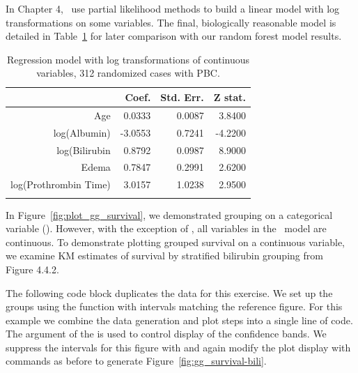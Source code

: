 \documentclass[nojss]{jss}\usepackage[]{graphicx}\usepackage[]{color}
\begin{document}
In Chapter 4,~\cite{fleming:1991} use partial likelihood methods to build a linear model with log transformations on some variables. The final, biologically reasonable model is detailed in Table~\ref{T:FHmodel} for later comparison with our random forest model results.

\begin{table}[ht]
\centering
{\footnotesize
\begin{tabular}{rrrr}
  \toprule
 & Coef. & Std. Err. & Z stat. \\ 
  \midrule
Age & 0.0333 & 0.0087 & 3.8400 \\ 
   \rowcolor[gray]{0.95}log(Albumin) & -3.0553 & 0.7241 & -4.2200 \\ 
  log(Bilirubin & 0.8792 & 0.0987 & 8.9000 \\ 
   \rowcolor[gray]{0.95}Edema & 0.7847 & 0.2991 & 2.6200 \\ 
  log(Prothrombin Time) & 3.0157 & 1.0238 & 2.9500 \\ 
   \rowcolor[gray]{0.95} \bottomrule
\end{tabular}
}
\caption{Regression model with log transformations of continuous variables, 312 randomized cases with PBC.} 
\label{T:FHmodel}
\end{table}


In Figure~\ref{fig:plot_gg_survival}, we demonstrated grouping on a categorical variable (). However, with the exception of , all variables in the~\cite{fleming:1991} model are continuous. To demonstrate plotting grouped survival on a continuous variable, we examine KM estimates of survival by stratified bilirubin grouping from~\cite{fleming:1991} Figure 4.4.2. 

The following code block duplicates the  data for this exercise. We set up the  groups using the  function with intervals matching the reference figure. For this example we combine the data generation and plot steps into a single line of code. The  argument of the  is used to control display of the confidence bands. We suppress the intervals for this figure with  and again modify the plot display with  commands as before to generate Figure~\ref{fig:gg_survival-bili}.
\end{document}
